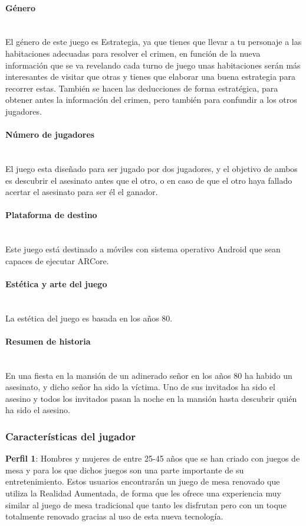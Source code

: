 \paragraph{Género}\mbox{}\\
El género de este juego es Estrategia, ya que tienes que llevar a tu personaje a las habitaciones adecuadas para resolver el crimen, en función de la nueva información que se va revelando cada turno de juego unas habitaciones serán más interesantes de visitar que otras y tienes que elaborar una buena estrategia para recorrer estas. También se hacen las deducciones de forma estratégica, para obtener antes la información del crimen, pero también para confundir a los otros jugadores.

\paragraph{Número de jugadores}\mbox{}\\
El juego esta diseñado para ser jugado por dos jugadores, y el objetivo de ambos es descubrir el asesinato antes que el otro, o en caso de que el otro haya fallado acertar el asesinato para ser él el ganador.

\paragraph{Plataforma de destino}\mbox{}\\
Este juego está destinado a móviles con sistema operativo Android que sean capaces de ejecutar ARCore.

\paragraph{Estética y arte del juego}\mbox{}\\
La estética del juego es basada en los años 80.

\paragraph{Resumen de historia}\mbox{}\\
En una fiesta en la mansión de un adinerado señor en los años 80 ha habido un asesinato, y dicho señor ha sido la víctima. Uno de sus invitados ha sido el asesino y todos los invitados pasan la noche en la mansión hasta descubrir quién ha sido el asesino.

\subsubsection{Características del jugador}
\textbf{Perfil 1}: Hombres y mujeres de entre 25-45 años que se han criado con juegos de mesa y para los que dichos juegos son una parte importante de su entretenimiento. Estos usuarios encontrarán un juego de mesa renovado que utiliza la Realidad Aumentada, de forma que les ofrece una experiencia muy similar al juego de mesa tradicional que tanto les disfrutan pero con un toque totalmente renovado gracias al uso de esta nueva tecnología.\\

